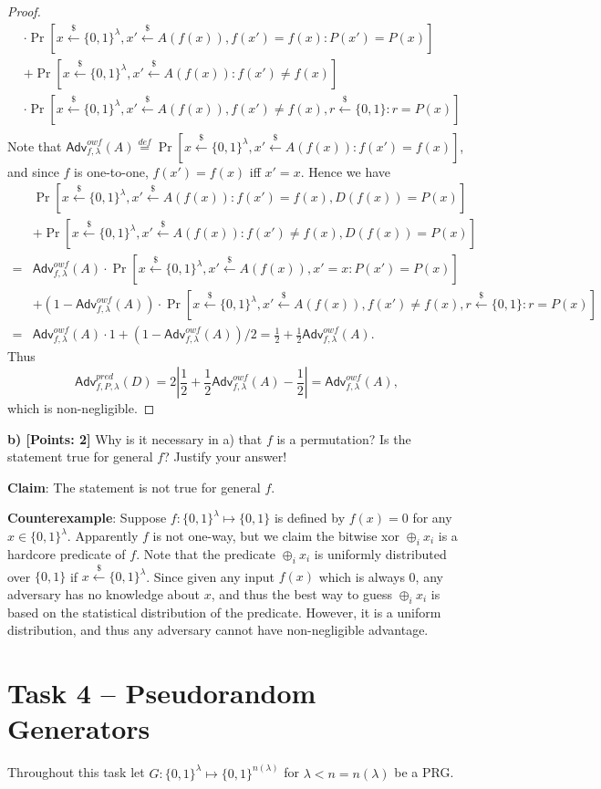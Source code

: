 \documentclass[12pt]{article}
\newcommand{\eqdef}{\stackrel{def}{=}}
\newcommand{\bits}{\{0,1\}}
\newcommand{\getsr}{\stackrel{\$}{\gets}}
\newcommand{\Adv}{\textsf{Adv}}
\theoremstyle{definition}
\begin{document}
\begin{proof}
$$\begin{aligned}
&\cdot\Pr[x\getsr\bits^\lambda, x'\getsr A(f(x)), f(x')=f(x): P(x') = P(x)] \\
&+\Pr[x\getsr\bits^\lambda, x'\getsr A(f(x)) : f(x')\not=f(x)]\\
&\cdot\Pr[x\getsr\bits^\lambda, x'\getsr A(f(x)), f(x')\not=f(x), r\getsr\bits: r = P(x)] \\
\end{aligned}
$$
Note that $\Adv_{f,\lambda}^{owf}(A) \eqdef \Pr[x\getsr\bits^\lambda, x'\getsr A(f(x)) : f(x')=f(x)]$, and since $f$ is one-to-one, $f(x')=f(x)$ iff $x'=x$. Hence we have
$$
\begin{aligned}
&\Pr[x\getsr\bits^\lambda, x'\getsr A(f(x)) : f(x')=f(x), D(f(x)) = P(x)] \\
&+\Pr[x\getsr\bits^\lambda, x'\getsr A(f(x)) : f(x')\not=f(x), D(f(x)) = P(x)] \\
=&\Adv_{f,\lambda}^{owf}(A)\cdot\Pr[x\getsr\bits^\lambda, x'\getsr A(f(x)), x'=x: P(x') = P(x)] \\
&+(1-\Adv_{f,\lambda}^{owf}(A))\cdot\Pr[x\getsr\bits^\lambda, x'\getsr A(f(x)), f(x')\not=f(x), r\getsr\bits: r = P(x)] \\
=&\Adv_{f,\lambda}^{owf}(A)\cdot 1 + (1-\Adv_{f,\lambda}^{owf}(A))/2 = \frac{1}{2} + \frac{1}{2}\Adv_{f,\lambda}^{owf}(A).
\end{aligned}
$$
Thus
$$\Adv_{f,P,\lambda}^{pred}(D) = 2\left| \frac{1}{2} + \frac{1}{2}\Adv_{f,\lambda}^{owf}(A)-\frac{1}{2} \right| = \Adv_{f,\lambda}^{owf}(A),$$
which is non-negligible.
\end{proof}

{\bf b) [Points: 2]} Why is it necessary in a) that $f$ is a permutation? Is the statement true for
general $f$? Justify your answer!

{\bf Claim}: The statement is not true for general $f$.

{\bf Counterexample}: Suppose $f : \bits^\lambda \mapsto \bits$ is defined by $f(x) = 0$ for any $x\in\bits^\lambda$. Apparently $f$ is not one-way, but we claim the bitwise xor $\oplus_i x_i$ is a hardcore predicate of $f$. Note that the predicate $\oplus_i x_i$ is uniformly distributed over $\bits$ if $x\getsr\bits^\lambda$. Since given any input $f(x)$ which is always 0, any adversary has no knowledge about $x$, and thus the best way to guess $\oplus_i x_i$ is based on the statistical distribution of the predicate. However, it is a uniform distribution, and thus any adversary cannot have non-negligible advantage.


\section{Task 4 – Pseudorandom Generators}
Throughout this task let $G : \bits^\lambda \mapsto \bits^{n(\lambda)}$ for $\lambda<n=n(\lambda)$ be a PRG.
\end{document}
